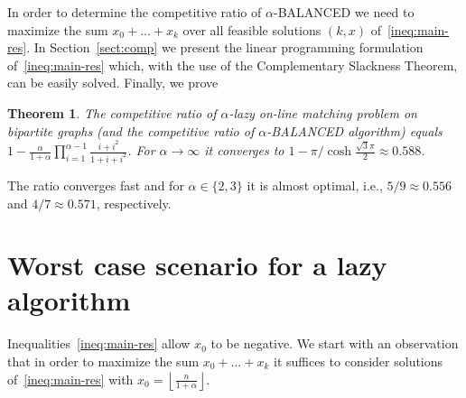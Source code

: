 \documentclass[12pt]{amsart}
\newtheorem{theorem}{Theorem}[section]
\theoremstyle{definition}
\newcommand{\Alg}[0]{\textsf{BALANCED}\xspace}
\begin{document}
In order to determine the competitive ratio of $\alpha$-\Alg{} we need to maximize the sum $x_0+\ldots+x_k$ over all feasible solutions $(k,x)$ of~\eqref{ineq:main-res}.
In Section~\ref{sect:comp} we present the linear programming formulation of~\eqref{ineq:main-res} which, with the use of the Complementary Slackness Theorem, can be easily solved. Finally, we prove
\begin{theorem}\label{thm:ratio}
 The competitive ratio of $\alpha$-lazy on-line matching problem on bipartite graphs 
 (and the competitive ratio of 
 $\alpha$-\Alg{} algorithm)  equals
$1 - \frac{\alpha}{1+\alpha}\prod_{i=1}^{\alpha-1}\frac{i+i^2}{1+i+i^2}$. For $\alpha\to\infty$ it converges to $1 - {\pi}/{\cosh \frac{\sqrt 3 \pi}{2}}\approx 0.588$.
\end{theorem}
The ratio converges fast and for $\alpha\in\{2,3\}$ it is almost optimal, i.e., $5/9\approx 0.556$ and $4/7\approx 0.571$, respectively.

\section{Worst case scenario for a lazy algorithm}
\label{sect:worst_adapive}
Inequalities~\eqref{ineq:main-res} allow $x_0$ to be negative. 
We start with an observation
that in order to maximize the sum $x_0+\ldots+x_k$ it suffices 
to consider solutions of~\eqref{ineq:main-res} with $x_0=\left\lfloor\frac{n}{1+\alpha}\right\rfloor$.
\end{document}
